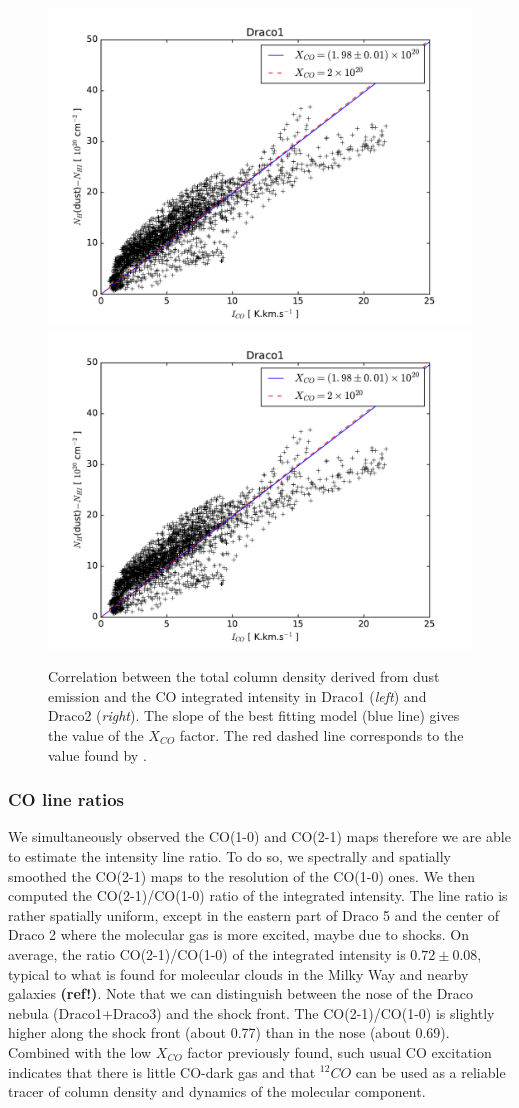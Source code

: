 \documentclass[traditabstract]{aa}
\begin{document}
\begin{figure}[h!]
  \includegraphics[page=10,width=0.48\linewidth,trim=30 10 50 25,clip=true]{Figures/dust-CO_comparison.pdf}
  \hspace{3mm}
  \includegraphics[page=12,width=0.48\linewidth,trim=30 10 50 25,clip=true]{Figures/dust-CO_comparison.pdf}
  \caption{\label{Xco} Correlation between the total column density derived from dust emission and the CO integrated intensity in Draco1 (\emph{left}) and Draco2 (\emph{right}). The slope of the best fitting model (blue line) gives the value of the $X_{CO}$ factor. The red dashed line corresponds to the value found by \cite{Moritz_1998}.}
\end{figure}


      \subsubsection{CO line ratios}

   We simultaneously observed the CO(1-0) and CO(2-1) maps therefore we are able to estimate the intensity line ratio. To do so, we spectrally and spatially smoothed the CO(2-1) maps to the resolution of the CO(1-0) ones. We then computed the CO(2-1)/CO(1-0) ratio of the integrated intensity. The line ratio is rather spatially uniform, except in the eastern part of Draco 5 and the center of Draco 2 where the molecular gas is more excited, maybe due to shocks.
On average, the ratio CO(2-1)/CO(1-0) of the integrated intensity is $0.72\pm 0.08$, typical to what is found for molecular clouds in the Milky Way and nearby galaxies \textbf{(ref!)}.
Note that we can distinguish between the nose of the Draco nebula (Draco1+Draco3) and the shock front. The CO(2-1)/CO(1-0) is slightly higher along the shock front (about 0.77) than in the nose (about 0.69).
Combined with the low $X_{CO}$ factor previously found, such usual CO excitation indicates that there is little CO-dark gas and that $^{12}CO$ can be used as a reliable tracer of column density and dynamics of the molecular component.
\end{document}
